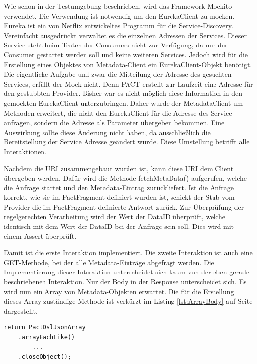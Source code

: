\documentclass{llncs}
\begin{document}
Wie schon in der Testumgebung beschrieben, wird das Framework Mockito verwendet. Die Verwendung ist notwendig um den EurekaClient zu mocken. Eureka \cite{Ranganathan2012} ist ein von Netflix entwickeltes Programm für die Service-Discovery. Vereinfacht ausgedrückt verwaltet es die einzelnen Adressen der Services. Dieser Service steht beim Testen des Consumers nicht zur Verfügung, da nur der Consumer gestartet werden soll und keine weiteren Services. Jedoch wird für die Erstellung eines Objektes von Metadata-Client ein EurekaClient-Objekt benötigt. Die eigentliche Aufgabe und zwar die Mitteilung der Adresse des gesuchten Services, erfüllt der Mock nicht. Denn PACT erstellt zur Laufzeit eine Adresse für den gestubbten Provider. Bisher war es nicht möglich diese Information in den gemockten EurekaClient unterzubringen. Daher wurde der MetadataClient um Methoden erweitert, die nicht den EurekaClient für die Adresse des Service anfragen, sondern die Adresse als Parameter übergeben bekommen. Eine Auswirkung sollte diese Änderung nicht haben, da ausschließlich die Bereitstellung der Service Adresse geändert wurde. Diese Umstellung betrifft alle Interaktionen.

Nachdem die URI zusammengebaut wurden ist, kann diese URI dem Client übergeben werden. Dafür wird die Methode fetchMetaData() aufgerufen, welche die Anfrage startet und den Metadata-Eintrag zurückliefert. Ist die Anfrage korrekt, wie sie im PactFragment definiert wurden ist, schickt der Stub vom Provider die im PactFragment definierte Antwort zurück. Zur Überprüfung der regelgerechten Verarbeitung wird der Wert der DataID überprüft, welche identisch mit dem Wert der DataID bei der Anfrage sein soll. Dies wird mit einem Assert überprüft.

Damit ist die erste Interaktion implementiert. Die zweite Interaktion ist auch eine GET-Methode, bei der alle Metadata-Einträge abgefragt werden. Die Implementierung dieser Interaktion unterscheidet sich kaum von der eben gerade beschriebenen Interaktion. Nur der Body in der Response unterscheidet sich. Es wird nun ein Array von Metadata-Objekten erwartet. Die für die Erstellung dieses Array zuständige Methode ist verkürzt im Listing \ref{lst:ArrayBody} auf Seite \pageref{lst:ArrayBody} dargestellt.

\lstset{language = Java}
\begin{lstlisting}[caption=Erstellung eines Array,label={lst:ArrayBody}]
return PactDslJsonArray
    .arrayEachLike()
        ...
    .closeObject();
\end{lstlisting}
\end{document}
